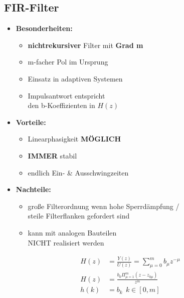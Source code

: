 \documentclass[10pt,a4paper]{article}
\begin{document}
\begin{minipage}{0.5\textwidth}  
\subsection{FIR-Filter}
\begin{itemize}
  \item \textbf{Besonderheiten: }
       \begin{itemize}
       \item \textbf{nichtrekursiver} Filter mit \textbf{Grad m}
       \item m-facher Pol im Ursprung 
       \item Einsatz in adaptiven Systemen 
       \item Impulsantwort entspricht\\
       den b-Koeffizienten in $H(z)$
       \end{itemize}
  \item \textbf{Vorteile: }
    \begin{itemize}
     \item Linearphasigkeit \textbf{MÖGLICH}
     \item \textbf{IMMER} stabil
     \item endlich Ein- \& Ausschwingzeiten
     \end{itemize}
  \item \textbf{Nachteile: }
    \begin{itemize}
    \item große Filterordnung wenn hohe Sperrdämpfung / \\
    steile Filterflanken gefordert sind
    \item kann mit analogen Bauteilen \\
    NICHT realisiert werden
    \end{itemize}
\end{itemize}

  \begin{mdframed}[style=exercise]
    \begin{align}
        H(z)&=\frac{Y(z)}{U(z)}= \sum_{\mu=0}^{m} b_\mu z^{-\mu} \\
        H(z)&=\frac{b_0\Pi_{\mu=1}^{m}(z-z_{0\mu})}{z^m}\\
        h(k)&= b_k \ \ k\in[0,m] 
    \end{align}
  \end{mdframed}
\end{minipage}  
\end{document}
